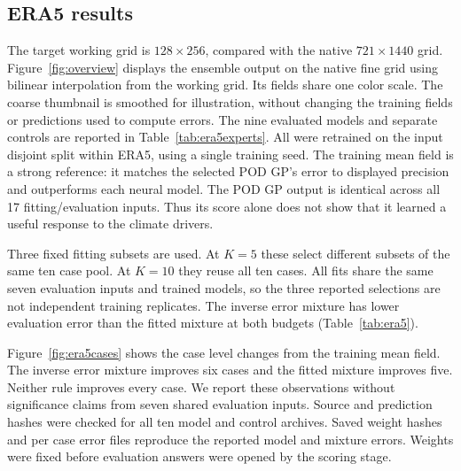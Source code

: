 \subsection{ERA5 results}
\label{app:era5}
\begin{table}[t]
\centering\small
\caption{\textbf{ERA5 favors the simple mixture.} Mean relative $L^2$ errors
in percent on seven evaluation cases. Three fitting selections share the same
models trained with a single seed and evaluation inputs. $K=10$ repeats the same ten case pool.}
\label{tab:era5}
\end{table}
The target working grid is $128\times256$, compared with the native $721\times1440$
grid. Figure~\ref{fig:overview} displays the ensemble output on the native fine
grid using bilinear interpolation from the working grid. Its fields share one
color scale. The coarse thumbnail is smoothed for illustration, without
changing the training fields or predictions used to compute errors.
The nine evaluated models and separate controls are reported in
Table~\ref{tab:era5experts}. All were retrained on the input disjoint split within ERA5, using a single training seed.
The training mean field is a strong reference: it matches the selected POD GP's error
to displayed precision and outperforms each neural model. The POD GP output is
identical across all 17 fitting/evaluation inputs. Thus its score alone does not
show that it learned a useful response to the climate drivers.

\begin{table}[h!]
\centering\small
\caption{\textbf{All ERA5 models and controls.} Errors are mean relative $L^2$
percentages over the same seven evaluation cases. The separate fine only FNO and
training mean controls are not additional members of the nine model mixture.}
\label{tab:era5experts}
\end{table}

Three fixed fitting subsets are used. At $K=5$ these select different subsets
of the same ten case pool. At $K=10$ they reuse all ten cases. All fits share the same
seven evaluation inputs and trained models, so the three reported selections are
not independent training replicates. The inverse error mixture has lower
evaluation error than the fitted mixture at both budgets (Table~\ref{tab:era5}).

Figure~\ref{fig:era5cases} shows the case level changes from the training mean field.
The inverse error mixture improves six cases and the fitted mixture improves five.
Neither rule improves every case. We report these observations without
significance claims from seven shared evaluation inputs. Source and prediction
hashes were checked for all ten model and control archives. Saved weight hashes
and per case error files reproduce the reported model and mixture errors. Weights were fixed before evaluation answers were opened by the
scoring stage.


